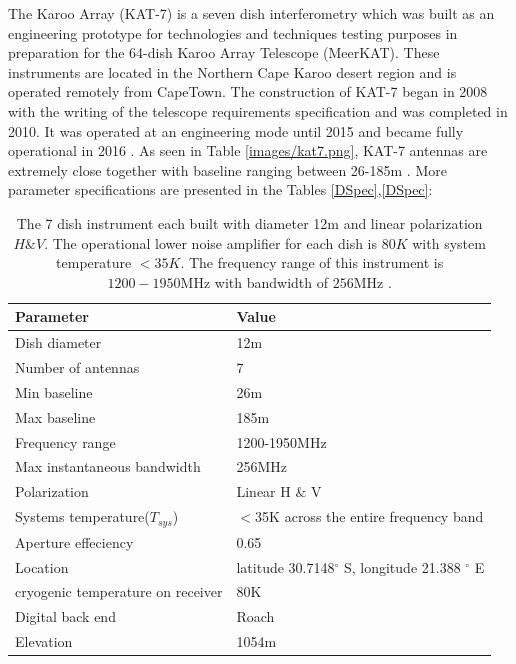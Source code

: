 The Karoo Array (KAT-7) is a seven dish interferometry which was built as an engineering prototype for technologies and techniques testing purposes in preparation for the 64-dish Karoo Array Telescope (MeerKAT). These instruments are located in the Northern Cape Karoo desert region and is operated remotely from CapeTown. The construction of  KAT-7 began in
2008 with the writing of the telescope requirements specification and was completed in 2010.  It was operated at an engineering mode until 2015  and became fully operational in 2016  \citep{foley2016engineering}. As seen in Table \ref{images/kat7.png}, KAT-7 antennas are extremely close together with baseline ranging between 26-185m \citep{carignan2013kat}. More parameter specifications are presented in the Tables \ref{DSpec},\ref{DSpec}:

\begin{table}[H]\centering
\begin{tabular}{l l }
\toprule
\textbf{Parameter} & \textbf{Value}\\
\midrule
Dish diameter&12m \\
Number of antennas& 7\\
Min baseline & 26m\\
Max baseline & 185m\\
Frequency range & 1200-1950MHz\\
Max instantaneous bandwidth &256MHz\\
Polarization   & Linear H $\&$ V\\
Systems temperature($T_{sys}$) & $<$35K across the entire frequency band\\
Aperture effeciency & 0.65\\
Location &  latitude 30.7148$^{\circ}$ S, longitude 21.388 $^{\circ}$ E\\
cryogenic temperature on receiver & 80K\\
Digital back end & Roach \\
Elevation & 1054m\\
\bottomrule
\end{tabular}
\caption{The 7 dish instrument each built with diameter 12m and linear polarization $H \& V$. The operational lower noise amplifier for each dish is $80K$  with system temperature $<35K$. The frequency range of this instrument is $1200-1950 \text{MHz}$ with bandwidth of $256\text{MHz}$ \citep{foley2016engineering}.}
\label{K7 spec}
\end{table}

